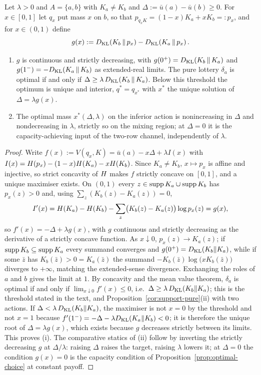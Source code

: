 \begin{proposition}\label{prop:binary}
Let $\lambda>0$ and $A=\{a,b\}$ with $K_a\ne K_b$ and
$\Delta:=\bar u(a)-\bar u(b)\ge0$.  For $x\in[0,1]$ let $q_x$ put mass $x$ on $b$, so that
$p_{q_xK}=(1-x)K_a+xK_b=:p_x$, and for $x\in(0,1)$ define
\[
 g(x):=D_{\mathrm{KL}}\!\left(K_b\,\middle\|\,p_x\right)-D_{\mathrm{KL}}\!\left(K_a\,\middle\|\,p_x\right).
\]
\begin{enumerate}[label=\textup{(\roman*)},leftmargin=*]
\item $g$ is continuous and strictly decreasing, with $g(0^+)=D_{\mathrm{KL}}(K_b\,\|\,K_a)$ and
$g(1^-)=-D_{\mathrm{KL}}(K_a\,\|\,K_b)$ as extended-real limits.  The pure lottery $\delta_a$ is optimal if and only if
$\Delta\ge\lambda\,D_{\mathrm{KL}}(K_b\,\|\,K_a)$.  Below this threshold the optimum is unique and interior,
$q^*=q_{x^*}$ with $x^*$ the unique solution of $\Delta=\lambda g(x)$.
\item The optimal mass $x^*(\Delta,\lambda)$ on the inferior action is nonincreasing in $\Delta$ and
nondecreasing in $\lambda$, strictly so on the mixing region; at $\Delta=0$ it is the capacity-achieving input
of the two-row channel, independently of $\lambda$.
\end{enumerate}
\end{proposition}

\begin{proof}
Write $f(x):=V(q_x,K)=\bar u(a)-x\Delta+\lambda I(x)$ with
$I(x)=H(p_x)-(1-x)H(K_a)-xH(K_b)$.  Since $K_a\ne K_b$,
$x\mapsto p_x$ is affine and injective, so strict concavity of $H$ \cite{CoverThomas2006} makes $f$ strictly
concave on $[0,1]$, and a unique maximiser exists.  On $(0,1)$ every $z\in\operatorname{supp} K_a\cup\operatorname{supp} K_b$ has $p_x(z)>0$
and, using $\sum_z(K_b(z)-K_a(z))=0$,
\[
 I'(x)=H(K_a)-H(K_b)-\sum_z\bigl(K_b(z)-K_a(z)\bigr)\log p_x(z)=g(x),
\]
so $f'(x)=-\Delta+\lambda g(x)$, with $g$ continuous and strictly decreasing as the derivative of a strictly
concave function.  As $x\downarrow0$, $p_x(z)\to K_a(z)$; if $\operatorname{supp} K_b\subseteq\operatorname{supp} K_a$ every summand converges
and $g(0^+)=D_{\mathrm{KL}}(K_b\|K_a)$, while if some $\bar z$ has $K_b(\bar z)>0=K_a(\bar z)$ the summand
$-K_b(\bar z)\log\bigl(xK_b(\bar z)\bigr)$ diverges to $+\infty$, matching the extended-sense divergence.
Exchanging the roles of $a$ and $b$ gives the limit at $1$.  By concavity and the mean value theorem,
$\delta_a$ is optimal if and only if $\lim_{x\downarrow0}f'(x)\le0$, i.e.\ $\Delta\ge\lambda\,D_{\mathrm{KL}}(K_b\|K_a)$;
this is the threshold stated in the text, and Proposition~\ref{cor:support-pure}\textup{(ii)} with two actions.
If $\Delta<\lambda\,D_{\mathrm{KL}}(K_b\|K_a)$, the maximiser is not $x=0$ by the threshold and not $x=1$
because $f'(1^-)=-\Delta-\lambda D_{\mathrm{KL}}(K_a\|K_b)<0$; it is therefore the unique root of $\Delta=\lambda g(x)$, which
exists because $g$ decreases strictly between its limits.  This proves \textup{(i)}.  The comparative statics of
\textup{(ii)} follow by inverting the
strictly decreasing $g$ at $\Delta/\lambda$: raising $\Delta$ raises the target, raising $\lambda$ lowers it; at
$\Delta=0$ the condition $g(x)=0$ is the capacity condition of Proposition~\ref{prop:optimal-choice} at constant
payoff.
\end{proof}

